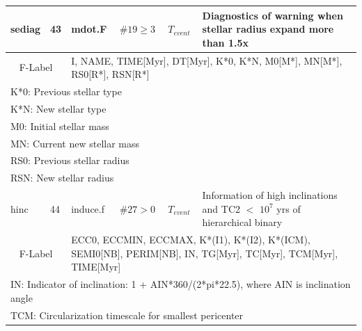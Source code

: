 \begin{longtable}{||p{0.42in}|p{0.25in}|p{0.6in}|p{0.6in}|p{0.4in}|p{2.3in}||}
  sediag    & 43  & mdot.F     & $\#19\geq3$        & $T_{event}$   & Diagnostics of warning when stellar radius expand more than 1.5x \\\hline
\multicolumn{2}{|c|}{ F-Label } & \multicolumn{4}{|p{4.4in}|}{ I, NAME, TIME[Myr], DT[Myr], K*0, K*N, M0[M*], MN[M*], RS0[R*], RSN[R*] }\\\hline
\multicolumn{6}{|p{5.4in}|}{ K*0: Previous stellar type }\\
\multicolumn{6}{|p{5.4in}|}{ K*N: New stellar type }\\
\multicolumn{6}{|p{5.4in}|}{ M0:  Initial stellar mass }\\
\multicolumn{6}{|p{5.4in}|}{ MN:  Current new stellar mass }\\
\multicolumn{6}{|p{5.4in}|}{ RS0: Previous stellar radius}\\
\multicolumn{6}{|p{5.4in}|}{ RSN: New stellar radius }\\\hline\hline

  hinc     & 44  & induce.f   & $\#27>0$  & $T_{event}$   & Information of high inclinations and TC2 $<$ $10^7$ yrs of hierarchical binary \\\hline
\multicolumn{2}{|c|}{ F-Label } & \multicolumn{4}{|p{4.4in}|}{ ECC0, ECCMIN, ECCMAX, K*(I1), K*(I2), K*(ICM), SEMI0[NB], PERIM[NB], IN, TG[Myr], TC[Myr], TCM[Myr], TIME[Myr] }\\\hline
\multicolumn{6}{|p{5.4in}|}{ IN: Indicator of inclination: 1 + AIN*360/(2*pi*22.5), where AIN is inclination angle }\\
\multicolumn{6}{|p{5.4in}|}{ TCM: Circularization timescale for smallest pericenter} \\
\hline\hline


\end{longtable}
